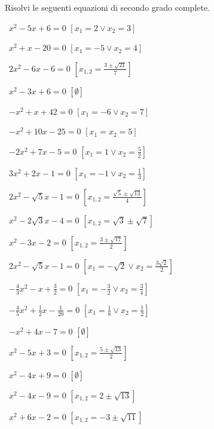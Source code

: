 
\begin{esercizio}[\Ast]
 \label{ese:3.12}
Risolvi le seguenti equazioni di secondo grado complete.
\begin{multicols}{2}
 \begin{enumeratea}
 \item~$x^{2}-5 x + 6=0$
  \hfill$\left[x_{1} = 2 \vee x_{2} = 3\right]$
 \item~$x^{2} + x-20=0$
  \hfill$\left[x_{1} =-5 \vee x_{2} = 4\right]$
 \item~$2 x^{2}-6 x-6=0$
  \hfill$\left[x_{1,2} = \frac{3 \pm \sqrt{21}}{7}\right]$
 \item~$x^{2}-3 x + 6=0$
  \hfill$\left[\emptyset\right]$
 \item~$- x^{2} + x + 42=0$
  \hfill$\left[x_{1} =-6 \vee x_{2} = 7\right]$
 \item~$- x^{2} + 10 x-25=0$
  \hfill$\left[x_{1} = x_{2} = 5\right]$
 \item~$- 2 x^{2} + 7 x-5=0$
  \hfill$\left[x_{1} = 1 \vee x_{2} = \frac{5}{2}\right]$
 \item~$3 x^{2} + 2 x-1=0$
  \hfill$\left[x_{1} =-1 \vee x_{2} = \frac{1}{3}\right]$
 \item~$2 x^{2}-\sqrt{5} x-1 = 0$
  \hfill$\left[x_{1,2} = \frac{\sqrt{5} \pm \sqrt{13}}{4}\right]$
 \item~$x^{2}-2 \sqrt{3} x-4=0$
  \hfill$\left[x_{1,2} = \sqrt{3} \pm \sqrt{7}\right]$
 \item~$x^{2}-3 x-2=0$
  \hfill$\left[x_{1,2} = \frac{3 \pm \sqrt{17}}{2}\right]$
 \item~$2 x^{2}-\sqrt{5} x-1=0$
  \hfill$\left[x_{1} =-\sqrt{2} \vee x_{2} = \frac{3 \sqrt{2}}{2}\right]$
 \item~$- \frac{4}{3} x^{2}-x + \frac{3}{2}=0$
  \hfill$\left[x_{1} =-\frac{3}{2} \vee x_{2} = \frac{3}{4}\right]$
 \item~$- \frac{4}{5} x^{2} + \frac{1}{2} x-\frac{1}{20}=0$
  \hfill$\left[x_{1} = \frac{1}{8} \vee x_{2} = \frac{1}{2}\right]$
 \item~$- x^{2} + 4 x-7=0$
  \hfill$\left[\emptyset\right]$
 \item~$x^{2}-5 x + 3 = 0$
  \hfill$\left[x_{1,2} = \frac{5 \pm \sqrt{13}}{2}\right]$
 \item~$x^{2}-4 x + 9 = 0$
  \hfill$\left[\emptyset\right]$
 \item~$x^{2}-4 x-9 = 0$
  \hfill$\left[x_{1,2} = 2 \pm \sqrt{13}\right]$
 \item~$x^{2} + 6 x-2 = 0$
  \hfill$\left[x_{1,2} =-3 \pm \sqrt{11}\right]$
 \end{enumeratea}
 \end{multicols}
\end{esercizio}

